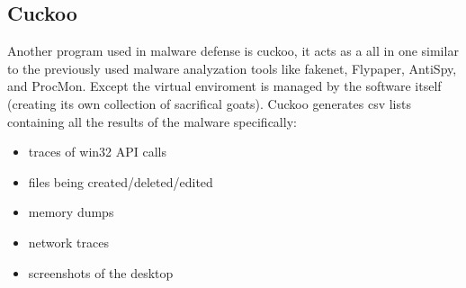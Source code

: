\documentclass[letterpaper,12pt,titlepage,onecolumn]{IEEEtran}
\begin{document}
\subsection{Cuckoo}
Another program used in malware defense is cuckoo, it acts as a all in one similar to the previously used malware analyzation tools like fakenet, Flypaper, AntiSpy, and ProcMon. Except the virtual enviroment is managed by the software itself (creating its own collection of sacrifical goats). Cuckoo generates csv lists containing all the results of the malware specifically:
\begin{itemize}
    \item traces of win32 API calls
    \item files being created/deleted/edited
    \item memory dumps
    \item network traces
    \item screenshots of the desktop
\end{itemize}


%
%
\end{document}
